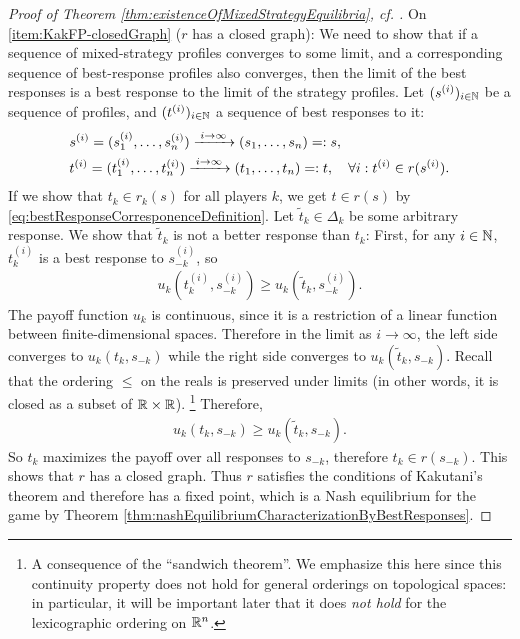 \documentclass[a4paper,DIV=11]{scrreprt}
\theoremstyle{definition}
\begin{document}
\begin{proof}[Proof of Theorem \ref{thm:existenceOfMixedStrategyEquilibria}, cf. {\cite[p.29]{bib:fudenbergGameTheory}}]
        On \ref{item:KakFP-closedGraph} ($r$ has a closed graph): We need to show that if a sequence of mixed-strategy profiles converges to some limit, and a corresponding sequence of best-response profiles also converges, then the limit of the best responses is a best response to the limit of the strategy profiles. Let $(s^{(i)})_{i \in \mathbb{N}}$ be a sequence of profiles, and $(t^{(i)})_{i \in \mathbb{N}}$ a sequence of best responses to it:
        \begin{align*}
            &s^{(i)} = (s_1^{(i)}, \dots, s_n^{(i)}) \xrightarrow{\;i \to \infty\;} (s_1, \dots, s_n) =: s, \\
            &t^{(i)} = (t_1^{(i)}, \dots, t_n^{(i)}) \xrightarrow{\;i \to \infty\;} (t_1, \dots, t_n) =: t, \quad
            \forall i: t^{(i)} \in r(s^{(i)}).
        \end{align*}
        If we show that $t_k \in r_k(s)$ for all players $k$, we get $t \in r(s)$ by \eqref{eq:bestResponseCorresponenceDefinition}.
        Let 
        $\tilde{t}_k \in \Delta_k$ be some arbitrary response. We show that $\tilde{t}_k$ is not a better response than $t_k$:
        First, for any $i \in \mathbb{N}$, $t^{(i)}_k$ is a best response to $s^{(i)}_{-k}$, so
        \begin{gather*}
            u_k(t^{(i)}_k, s^{(i)}_{-k}) \geq u_k(\tilde{t}_k, s^{(i)}_{-k}).
        \end{gather*}
        The payoff function $u_k$ is continuous, since it is a restriction of a linear function between finite-dimensional spaces. Therefore in the limit as $i \to \infty$, the left side converges to $u_k(t_k, s_{-k})$ while the right side converges to $u_k(\tilde{t}_k, s_{-k})$.
        Recall that the ordering $\leq$ on the reals is preserved under limits (in other words, it is closed as a subset of $\mathbb{R} \times \mathbb{R}$).
        \footnote{A consequence of the “sandwich theorem”. We emphasize this here since this continuity property does not hold for general orderings on topological spaces:
        in particular, it will be important later that it does \emph{not hold} for the lexicographic ordering on $\mathbb{R}^n$.}
        Therefore,
        \begin{gather*}
            u_k(t_k, s_{-k}) \geq u_k(\tilde{t}_k, s_{-k}).
        \end{gather*}
        So $t_k$ maximizes the payoff over all responses to $s_{-k}$, therefore $t_k \in r(s_{-k})$. This shows that $r$ has a closed graph.
        Thus $r$ satisfies the conditions of Kakutani's theorem and therefore has a fixed point, which is a Nash equilibrium for the game by Theorem \ref{thm:nashEquilibriumCharacterizationByBestResponses}.
    \end{proof}
    
\end{document}
